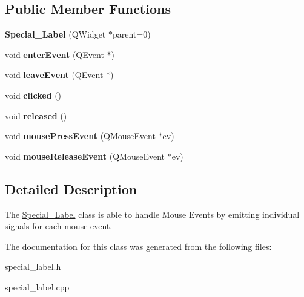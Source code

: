 \subsection*{Public Member Functions}
\begin{DoxyCompactItemize}
\item 
\hypertarget{class_special___label_a0521e7c5122e0827ab4007007d7e0c65}{}{\bfseries Special\+\_\+\+Label} (Q\+Widget $\ast$parent=0)\label{class_special___label_a0521e7c5122e0827ab4007007d7e0c65}

\item 
\hypertarget{class_special___label_a40c6006c6e0b1948104d4cbbc44d3fdc}{}void {\bfseries enter\+Event} (Q\+Event $\ast$)\label{class_special___label_a40c6006c6e0b1948104d4cbbc44d3fdc}

\item 
\hypertarget{class_special___label_a12e3db53d0413b2b664c0f7fd2cfa153}{}void {\bfseries leave\+Event} (Q\+Event $\ast$)\label{class_special___label_a12e3db53d0413b2b664c0f7fd2cfa153}

\item 
\hypertarget{class_special___label_a69b1cf24e1719c0a555e55d43dee1c31}{}void {\bfseries clicked} ()\label{class_special___label_a69b1cf24e1719c0a555e55d43dee1c31}

\item 
\hypertarget{class_special___label_a1143161eb572b45e556c7c794d1d7121}{}void {\bfseries released} ()\label{class_special___label_a1143161eb572b45e556c7c794d1d7121}

\item 
\hypertarget{class_special___label_a5ae3fe5084663c4541faa7466a23fefa}{}void {\bfseries mouse\+Press\+Event} (Q\+Mouse\+Event $\ast$ev)\label{class_special___label_a5ae3fe5084663c4541faa7466a23fefa}

\item 
\hypertarget{class_special___label_a46cb081e9b71bf02a9180541936af411}{}void {\bfseries mouse\+Release\+Event} (Q\+Mouse\+Event $\ast$ev)\label{class_special___label_a46cb081e9b71bf02a9180541936af411}

\end{DoxyCompactItemize}


\subsection{Detailed Description}
The \hyperlink{class_special___label}{Special\+\_\+\+Label} class is able to handle Mouse Events by emitting individual signals for each mouse event. 

The documentation for this class was generated from the following files\+:\begin{DoxyCompactItemize}
\item 
special\+\_\+label.\+h\item 
special\+\_\+label.\+cpp\end{DoxyCompactItemize}

